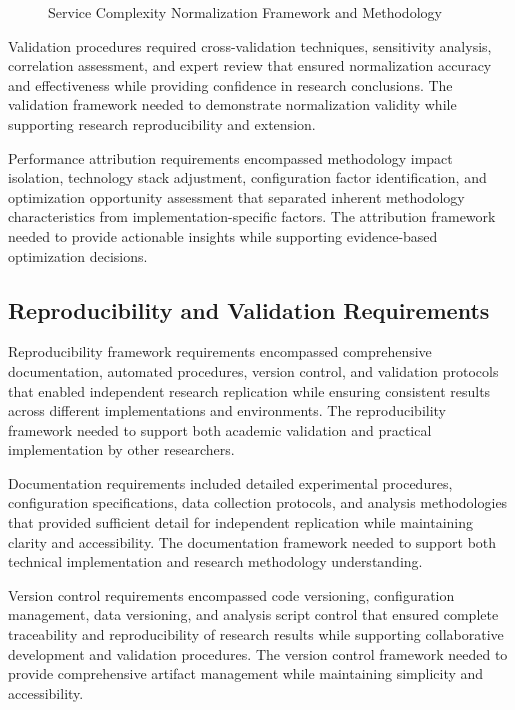 \begin{figure}[H]
\centering
\caption{Service Complexity Normalization Framework and Methodology}
\label{fig:complexity-normalization-framework}
\end{figure}

Validation procedures required cross-validation techniques, sensitivity analysis, correlation assessment, and expert review that ensured normalization accuracy and effectiveness while providing confidence in research conclusions. The validation framework needed to demonstrate normalization validity while supporting research reproducibility and extension.

Performance attribution requirements encompassed methodology impact isolation, technology stack adjustment, configuration factor identification, and optimization opportunity assessment that separated inherent methodology characteristics from implementation-specific factors. The attribution framework needed to provide actionable insights while supporting evidence-based optimization decisions.

\subsection{Reproducibility and Validation Requirements}

Reproducibility framework requirements encompassed comprehensive documentation, automated procedures, version control, and validation protocols that enabled independent research replication while ensuring consistent results across different implementations and environments. The reproducibility framework needed to support both academic validation and practical implementation by other researchers.

Documentation requirements included detailed experimental procedures, configuration specifications, data collection protocols, and analysis methodologies that provided sufficient detail for independent replication while maintaining clarity and accessibility. The documentation framework needed to support both technical implementation and research methodology understanding.

Version control requirements encompassed code versioning, configuration management, data versioning, and analysis script control that ensured complete traceability and reproducibility of research results while supporting collaborative development and validation procedures. The version control framework needed to provide comprehensive artifact management while maintaining simplicity and accessibility.

